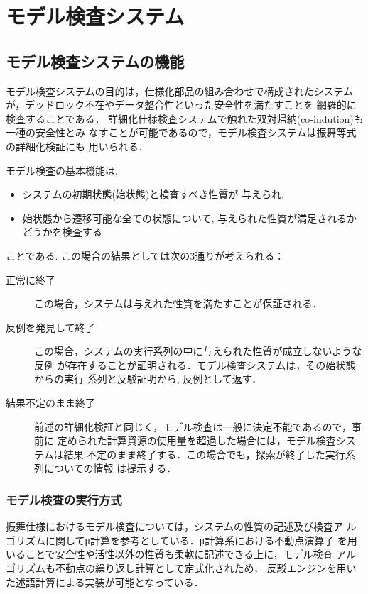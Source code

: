 \newpage
\chapter{モデル検査システム}
\label{sec:model-check}
%
\section{モデル検査システムの機能}
\label{sec:model-check-func}

モデル検査システムの目的は，仕様化部品の組み合わせで構成されたシステム
が，デッドロック不在やデータ整合性といった安全性を満たすことを
網羅的に検査することである．
詳細化仕様検査システムで触れた双対帰納(co-indution)も一種の安全性とみ
なすことが可能であるので，モデル検査システムは振舞等式の詳細化検証にも
用いられる．

モデル検査の基本機能は, 
\begin{itemize}
\item システムの初期状態(始状態)と検査すべき性質が
  与えられ, 
\item 始状態から遷移可能な全ての状態について, 
  与えられた性質が満足されるかどうかを検査する
\end{itemize}
ことである. 
この場合の結果としては次の3通りが考えられる：
\begin{description}
\item[正常に終了]
  この場合，システムは与えれた性質を満たすことが保証される．

\item[反例を発見して終了]
  この場合，システムの実行系列の中に与えられた性質が成立しないような反例
  が存在することが証明される．モデル検査システムは，その始状態からの実行
  系列と反駁証明から, 反例として返す．

\item[結果不定のまま終了]
  前述の詳細化検証と同じく，モデル検査は一般に決定不能であるので，事前に
  定められた計算資源の使用量を超過した場合には，モデル検査システムは結果
  不定のまま終了する．この場合でも，探索が終了した実行系列についての情報
  は提示する．

\end{description}

\subsection{モデル検査の実行方式}

振舞仕様におけるモデル検査については，システムの性質の記述及び検査ア
ルゴリズムに関してμ計算を参考としている．μ計算系における不動点演算子
を用いることで安全性や活性以外の性質も柔軟に記述できる上に，モデル検査
アルゴリズムも不動点の繰り返し計算として定式化されため，
反駁エンジンを用いた述語計算による実装が可能となっている．

